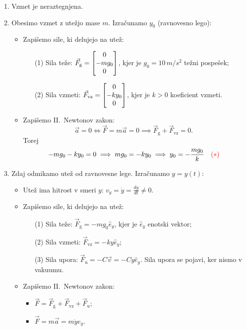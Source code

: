 \begin{enumerate}
    \item Vzmet je neraztegnjena.
    \item Obesimo vzmet z utežjo mase \(m\). Izračunamo \(y_0\) (ravnovesno lego):
    \begin{itemize}
        \item Zapišemo sile, ki delujejo na utež:
        \begin{enumerate}
            \item[(1)] Sila teže: \(\vec{F}_\text{g} = \begin{bmatrix} 0 \\ -mg_0 \\ 0 \end{bmatrix}\), kjer je \(g_0 = 10 \, m / s^2\) težni pospešek;
            \item[(2)] Sila vzmeti: \(\vec{F}_\text{vz} = \begin{bmatrix} 0 \\ -ky_0 \\ 0 \end{bmatrix}\), kjer je \(k > 0\) koeficient vzmeti.
        \end{enumerate}
        \item Zapišemo II.\ Newtonov zakon:
        \[
        \vec{a} = 0 \iff \vec{F} = m \vec{a} = 0 \implies \vec{F}_\text{g} + \vec{F}_\text{vz} = 0.
        \]
        Torej 
        \[
        -mg_0 - ky_0 = 0 \implies mg_0 = -ky_0 \implies y_0 = -\frac{mg_0}{k} \quad \textcolor{red}{(*)}
        \]        
    \end{itemize}
    \item Zdaj odmikamo utež od ravnovesne lege. Izračunamo \(y = y(t)\):
    \begin{itemize}
        \item Utež ima hitrost v smeri \(y\): \( v_y = \dot{y} = \frac{dy}{dt} \neq 0\).
        \item Zapišemo sile, ki delujejo na utež:
        \begin{itemize}
            \item[(1)] Sila teže: \(\vec{F}_\text{g} = -mg_0 \widehat{e}_y\), kjer je \(\widehat{e}_y\) enotski vektor;
            \item[(2)] Sila vzmeti: \(\vec{F}_\text{vz} = -ky\widehat{e}_y\);
            \item[(3)] Sila upora: \(\vec{F}_\text{u} = -C \vec{v} = -C \dot{y} \widehat{e}_y\). Sila upora se pojavi, ker nismo v vakuumu.
        \end{itemize}
        \item Zapišemo II.\ Newtonov zakon:
        \begin{itemize}
            \item \(\vec{F} = \vec{F}_\text{g} + \vec{F}_\text{vz} + \vec{F}_\text{u}\);
            \item \(\vec{F} = m \vec{a} = m \ddot{y} \widehat{e}_y\).

\end{itemize}
\end{itemize}
\end{enumerate}
